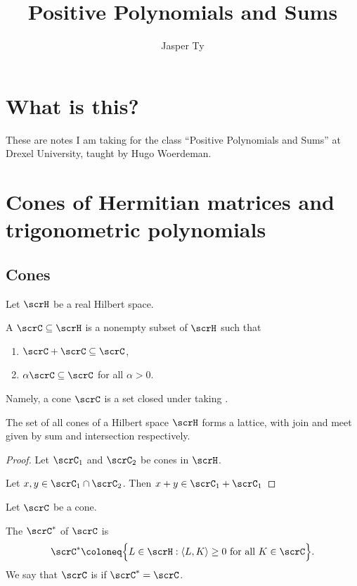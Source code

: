\documentclass{article}
\title{Positive Polynomials and Sums}
\author{Jasper Ty}
\date{}
\newcommand{\ip}[1]{\ensuremath{\left\langle{#1}\right\rangle}}
\begin{document}
\maketitle

\section*{What is this?}


These are notes I am taking for the class ``Positive Polynomials and Sums'' at Drexel University, taught by Hugo Woerdeman.

\tableofcontents

\section{Cones of Hermitian matrices and trigonometric polynomials}

\subsection{Cones}

\begin{definition}
    Let $\scrH$ be a real Hilbert space. 

    A  $\scrC \subseteq \scrH$ is a nonempty subset of $\scrH$ such that
    \begin{enumerate}[label=(\roman*)]
        \item 
            $\scrC + \scrC \subseteq \scrC$,
        \item 
            $\alpha\scrC \subseteq \scrC$ for all $\alpha > 0$.
    \end{enumerate}
\end{definition}

Namely, a cone $\scrC$ is a set closed under taking .

\begin{proposition}
    The set of all cones of a Hilbert space $\scrH$ forms a lattice, with join and meet given by sum and intersection respectively.
\end{proposition}
\begin{proof}
    Let $\scrC_1$ and $\scrC_2$ be cones in $\scrH$.

    Let $x, y \in \scrC_1 \cap \scrC_2$.
    Then $x + y \in \scrC_1 + \scrC_1$
\end{proof}

\begin{definition}
    Let $\scrC$ be a cone.

    The  $\scrC^\ast$ of $\scrC$ is 
    \[
        \scrC^\ast
        \coloneq
        \Big\{
            L \in \scrH
            :
            \ip{L,K} \geq 0 \text{ for all } K \in \scrC
        \Big\}.
    \]
    We say that $\scrC$ is  if $\scrC^\ast = \scrC$.
\end{definition}
\end{document}
